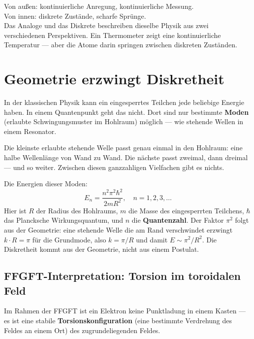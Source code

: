 \begin{keypoint}
Von außen: kontinuierliche Anregung, kontinuierliche Messung.\\
Von innen: diskrete Zustände, scharfe Sprünge.\\[4pt]
Das Analoge und das Diskrete beschreiben dieselbe Physik
aus zwei verschiedenen Perspektiven.
Ein Thermometer zeigt eine kontinuierliche Temperatur ---
aber die Atome darin springen zwischen diskreten Zuständen.
\end{keypoint}

\section{Geometrie erzwingt Diskretheit}
\label{sec:geometrie}

In der klassischen Physik kann ein eingesperrtes Teilchen
jede beliebige Energie haben. In einem Quantenpunkt geht
das nicht. Dort sind nur bestimmte \textbf{Moden}
(erlaubte Schwingungsmuster im Hohlraum) möglich ---
wie stehende Wellen in einem Resonator.

Die kleinste erlaubte stehende Welle passt genau einmal
in den Hohlraum: eine halbe Wellenlänge von Wand zu Wand.
Die nächste passt zweimal, dann dreimal --- und so weiter.
Zwischen diesen ganzzahligen Vielfachen gibt es nichts.

Die Energien dieser Moden:
\begin{equation}
  E_n = \frac{n^2 \pi^2 \hbar^2}{2m R^2},
  \quad n = 1, 2, 3, \ldots
\end{equation}
Hier ist $R$ der Radius des Hohlraums, $m$ die Masse des
eingesperrten Teilchens, $\hbar$ das Plancksche Wirkungsquantum,
und $n$ die \textbf{Quantenzahl}.
Der Faktor $\pi^2$ folgt aus der Geometrie: eine stehende Welle
die am Rand verschwindet erzwingt $k \cdot R = \pi$ für die Grundmode,
also $k = \pi/R$ und damit $E \sim \pi^2/R^2$.
Die Diskretheit kommt aus der Geometrie, nicht aus einem Postulat.

\subsection{FFGFT-Interpretation: Torsion im toroidalen Feld}

Im Rahmen der FFGFT ist ein Elektron keine Punktladung
in einem Kasten --- es ist eine stabile
\textbf{Torsionskonfiguration} (eine bestimmte Verdrehung
des Feldes an einem Ort) des zugrundeliegenden Feldes.

